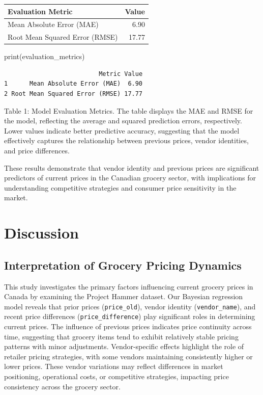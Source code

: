 \documentclass[
  letterpaper,
  DIV=11,
  numbers=noendperiod]{scrartcl}
\newenvironment{Shaded}{\begin{snugshade}}{\end{snugshade}}
\newcommand{\FunctionTok}[1]{\textcolor[rgb]{0.28,0.35,0.67}{#1}}
\newcommand{\NormalTok}[1]{\textcolor[rgb]{0.00,0.23,0.31}{#1}}
\begin{document}
\begin{longtable}[]{@{}lr@{}}
\toprule\noalign{}
Evaluation Metric & Value \\
\midrule\noalign{}
\endhead
\bottomrule\noalign{}
\endlastfoot
Mean Absolute Error (MAE) & 6.90 \\
Root Mean Squared Error (RMSE) & 17.77 \\
\end{longtable}

\begin{Shaded}
\begin{Highlighting}[]
\FunctionTok{print}\NormalTok{(evaluation\_metrics)}
\end{Highlighting}
\end{Shaded}

\begin{verbatim}
                          Metric Value
1      Mean Absolute Error (MAE)  6.90
2 Root Mean Squared Error (RMSE) 17.77
\end{verbatim}

Table 1: Model Evaluation Metrics. The table displays the MAE and RMSE
for the model, reflecting the average and squared prediction errors,
respectively. Lower values indicate better predictive accuracy,
suggesting that the model effectively captures the relationship between
previous prices, vendor identities, and price differences.

These results demonstrate that vendor identity and previous prices are
significant predictors of current prices in the Canadian grocery sector,
with implications for understanding competitive strategies and consumer
price sensitivity in the market.

\section{Discussion}\label{discussion}

\subsection{Interpretation of Grocery Pricing
Dynamics}\label{interpretation-of-grocery-pricing-dynamics}

This study investigates the primary factors influencing current grocery
prices in Canada by examining the Project Hammer dataset. Our Bayesian
regression model reveals that prior prices (\texttt{price\_old}), vendor
identity (\texttt{vendor\_name}), and recent price differences
(\texttt{price\_difference}) play significant roles in determining
current prices. The influence of previous prices indicates price
continuity across time, suggesting that grocery items tend to exhibit
relatively stable pricing patterns with minor adjustments.
Vendor-specific effects highlight the role of retailer pricing
strategies, with some vendors maintaining consistently higher or lower
prices. These vendor variations may reflect differences in market
positioning, operational costs, or competitive strategies, impacting
price consistency across the grocery sector.
\end{document}
